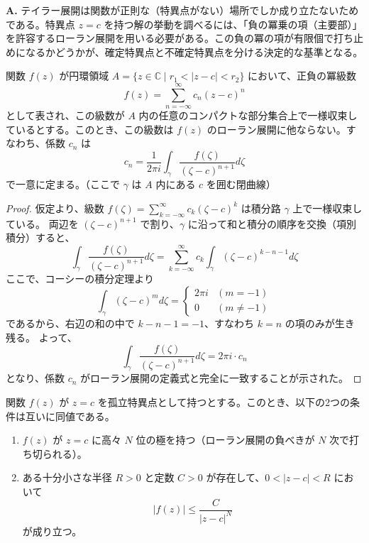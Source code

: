 \begin{Q}[なぜ特異点の周りでテイラー展開ではなくローラン展開を使うの？]
\textbf{A.} テイラー展開は関数が正則な（特異点がない）場所でしか成り立たないためである。特異点 $z=c$ を持つ解の挙動を調べるには、「負の冪乗の項（主要部）」を許容するローラン展開を用いる必要がある。この負の冪の項が有限個で打ち止めになるかどうかが、確定特異点と不確定特異点を分ける決定的な基準となる。
\end{Q}
\begin{theorem}[ローラン展開の一意性]\label{thm:laurent_uniqueness}
    関数 $f(z)$ が円環領域 $A = \{z \in \mathbb{C} \mid r_1 < |z-c| < r_2\}$ において、正負の冪級数
    \[
    f(z) = \sum_{n=-\infty}^{\infty} c_n (z-c)^n
    \]
    として表され、この級数が $A$ 内の任意のコンパクトな部分集合上で一様収束しているとする。このとき、この級数は $f(z)$ のローラン展開に他ならない。すなわち、係数 $c_n$ は
    \[
    c_n = \frac{1}{2\pi i} \int_{\gamma} \frac{f(\zeta)}{(\zeta-c)^{n+1}} d\zeta
    \]
    で一意に定まる。（ここで $\gamma$ は $A$ 内にある $c$ を囲む閉曲線）
\end{theorem}

\begin{proof}%
    仮定より、級数 $f(\zeta) = \sum_{k=-\infty}^{\infty} c_k (\zeta-c)^k$ は積分路 $\gamma$ 上で一様収束している。
    両辺を $(\zeta-c)^{n+1}$ で割り、$\gamma$ に沿って和と積分の順序を交換（項別積分）すると、
    \[
    \int_{\gamma} \frac{f(\zeta)}{(\zeta-c)^{n+1}} d\zeta = \sum_{k=-\infty}^{\infty} c_k \int_{\gamma} (\zeta-c)^{k-n-1} d\zeta
    \]
    ここで、コーシーの積分定理より
    \[
    \int_{\gamma} (\zeta-c)^{m} d\zeta =
    \begin{cases}
        2\pi i & (m = -1) \\
        0 & (m \neq -1)
    \end{cases}
    \]
    であるから、右辺の和の中で $k-n-1 = -1$、すなわち $k=n$ の項のみが生き残る。
    よって、
    \[
    \int_{\gamma} \frac{f(\zeta)}{(\zeta-c)^{n+1}} d\zeta = 2\pi i \cdot c_n
    \]
    となり、係数 $c_n$ がローラン展開の定義式と完全に一致することが示された。
\end{proof}
\begin{theorem}[孤立特異点における極と増大度の同値性]\label{thm:growth_and_pole}
    関数 $f(z)$ が $z=c$ を孤立特異点として持つとする。このとき、以下の2つの条件は互いに同値である。
    \begin{enumerate}
        \item[(P)] $f(z)$ が $z=c$ に高々 $N$ 位の極を持つ（ローラン展開の負べきが $N$ 次で打ち切られる）。
        \item[(Q)] ある十分小さな半径 $R > 0$ と定数 $C > 0$ が存在して、$0 < |z-c| < R$ において
        \[
        |f(z)| \le \frac{C}{|z-c|^N}
        \]
        が成り立つ。
    \end{enumerate}
\end{theorem}

